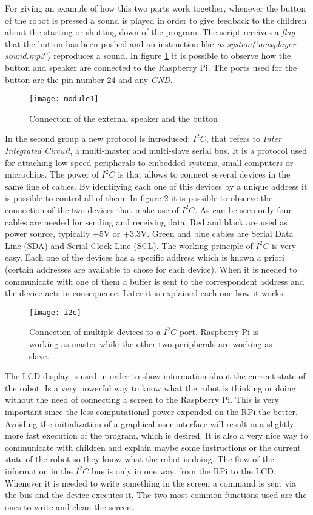 For giving an example of how this two parts work together, whenever the button of the robot is pressed a sound is played in order to give feedback to the children about the starting or shutting down of the program. The script receives a \textit{flag} that the button has been pushed and an instruction like \textit{os.system('omxplayer sound.mp3')} reproduces a sound. In figure \ref{fig:module1} it is possible to observe how the button and speaker are connected to the Raspberry Pi. The ports used for the button are the pin number 24 and any \textit{GND}.

\begin{figure}[h]
\centering
\texttt{[image: module1]}
\caption{Connection of the external speaker and the button}
\label{fig:module1}
\end{figure}

In the second group a new protocol is introduced: $I^{2}C$, that refers to \textit{Inter Integrated Circuit}, a multi-master and multi-slave serial bus. It is a protocol used for attaching low-speed peripherals to embedded systems, small computers or microchips. The power of $I^{2}C$ is that allows to connect several devices in the same line of cables. By identifying each one of this devices by a unique address it is possible to control all of them. In figure \ref{fig:i2c} it is possible to observe the connection of the two devices that make use of $I^{2}C$. As can be seen only four cables are needed for sending and receiving data. Red and black are used as power source, typically +5V or +3.3V. Green and blue cables are Serial Data Line (SDA) and Serial Clock Line (SCL). The working principle of $I^{2}C$ is very easy. Each one of the devices has a specific address which is known a priori (certain addresses are available to chose for each device). When it is needed to communicate with one of them a buffer is sent to the correspondent address and the device acts in consequence. Later it is explained each one how it works.

\begin{figure}[h]
\centering
\texttt{[image: i2c]}
\caption{Connection of multiple devices to a $I^{2}C$ port. Raspberry Pi is working as master while the other two peripherals are working as slave.}
\label{fig:i2c}
\end{figure}


The LCD display is used in order to show information about the current state of the robot. Is a very powerful way to know what the robot is thinking or doing without the need of connecting a screen to the Raspberry Pi. This is very important since the less computational power expended on the RPi the better. Avoiding the initialization of a graphical user interface will result in a slightly more fast execution of the program, which is desired. It is also a very nice way to communicate with children and explain maybe some instructions or the current state of the robot so they know what the robot is doing. The flow of the information in the $I^{2}C$ bus is only in one way, from the RPi to the LCD. Whenever it is needed to write something in the screen a command is sent via the bus and the device executes it. The two most common functions used are the ones to write and clean the screen.

